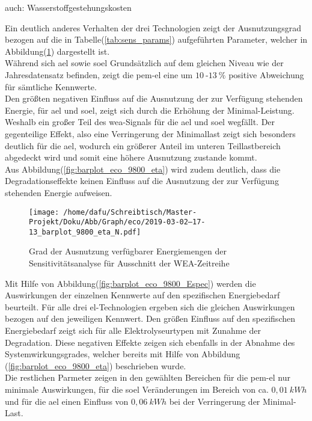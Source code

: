 \documentclass[onecolumn,10pt,titlepage]{article}
\begin{document}
auch: Wasserstoffgestehungskosten

Ein deutlich anderes Verhalten der drei Technologien zeigt der Ausnutzungsgrad  bezogen auf die in Tabelle(\ref{tab:sens_params}) aufgeführten Parameter, welcher in Abbildung(\ref{fig:barplot_eco_9800_etaN}) dargestellt ist. \\
Während sich \gls{ael} sowie \gls{soel} Grundsätzlich auf dem gleichen Niveau wie der Jahresdatensatz befinden, zeigt die \gls{pem}-\gls{el} eine um $10~$-$13~\%$ positive Abweichung für sämtliche Kennwerte.\\
Den größten negativen Einfluss auf die Ausnutzung der zur Verfügung stehenden Energie, für \gls{ael} und \gls{soel}, zeigt sich durch die Erhöhung der Minimal-Leistung. Weshalb ein großer Teil des \gls{wea}-Signals für die \gls{ael} und \gls{soel} wegfällt. Der gegenteilige Effekt, also eine Verringerung der Minimallast zeigt sich besonders deutlich für die \gls{ael}, wodurch ein größerer Anteil im unteren Teillastbereich abgedeckt wird und somit eine höhere Ausnutzung zustande kommt.\\
Aus Abbildung(\ref{fig:barplot_eco_9800_eta}) wird zudem deutlich, dass die Degradationseffekte keinen Einfluss auf die Ausnutzung der zur Verfügung stehenden Energie aufweisen.
\begin{figure}[H]
	\centering
	\texttt{[image: /home/dafu/Schreibtisch/Master-Projekt/Doku/Abb/Graph/eco/2019-03-02--17-13\_barplot\_9800\_eta\_N.pdf]}
	\caption[Ausnutzungsgrad Sensitivitätsanalyse]{Grad der Ausnutzung verfügbarer Energiemengen der Sensitivitätsanalyse für Ausschnitt der WEA-Zeitreihe}
	\label{fig:barplot_eco_9800_etaN}
\end{figure}
Mit Hilfe von Abbildung(\ref{fig:barplot_eco_9800_Espec}) werden die Auswirkungen der einzelnen Kennwerte auf den spezifischen Energiebedarf beurteilt. Für alle drei
\gls{el}-Technologien ergeben sich die gleichen Auswirkungen bezogen auf den jeweiligen Kennwert. Den größen Einfluss auf den spezifischen Energiebedarf zeigt sich für alle Elektrolyseurtypen mit Zunahme der Degradation. Diese negativen Effekte zeigen sich ebenfalls in der Abnahme des Systemwirkungsgrades, welcher bereits mit Hilfe von Abbildung (\ref{fig:barplot_eco_9800_eta}) beschrieben wurde.\\
Die restlichen Parmeter zeigen in den gewählten Bereichen für die \gls{pem}-\gls{el} nur minimale Auswirkungen, für die \gls{soel} Veränderungen im Bereich von ca. $0,01~kWh$ und für die \gls{ael} einen Einfluss von $0,06~kWh$ bei der Verringerung der Minimal-Last.
\end{document}
